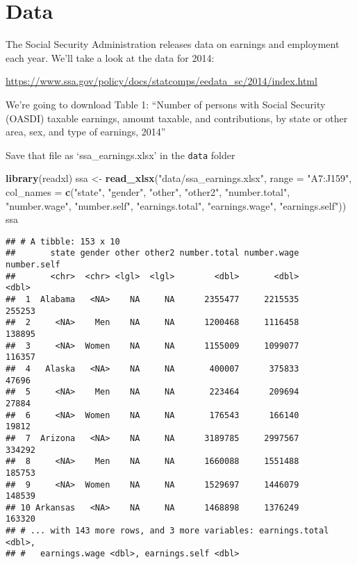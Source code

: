 \documentclass[]{book}
\newenvironment{Shaded}{\begin{snugshade}}{\end{snugshade}}
\newcommand{\KeywordTok}[1]{\textcolor[rgb]{0.13,0.29,0.53}{\textbf{{#1}}}}
\newcommand{\DataTypeTok}[1]{\textcolor[rgb]{0.13,0.29,0.53}{{#1}}}
\newcommand{\StringTok}[1]{\textcolor[rgb]{0.31,0.60,0.02}{{#1}}}
\newcommand{\NormalTok}[1]{{#1}}
\theoremstyle{definition}
\theoremstyle{definition}
\theoremstyle{remark}
\begin{document}
\section{Data}\label{data-3}

The Social Security Administration releases data on earnings and
employment each year. We'll take a look at the data for 2014:

\url{https://www.ssa.gov/policy/docs/statcomps/eedata_sc/2014/index.html}

We're going to download Table 1: ``Number of persons with Social
Security (OASDI) taxable earnings, amount taxable, and contributions, by
state or other area, sex, and type of earnings, 2014''

Save that file as `ssa\_earnings.xlsx' in the \texttt{data} folder

\begin{Shaded}
\begin{Highlighting}[]
\KeywordTok{library}\NormalTok{(readxl)}
\NormalTok{ssa <-}\StringTok{ }\KeywordTok{read_xlsx}\NormalTok{(}\StringTok{"data/ssa_earnings.xlsx"}\NormalTok{, }\DataTypeTok{range =} \StringTok{"A7:J159"}\NormalTok{, }
                 \DataTypeTok{col_names =} \KeywordTok{c}\NormalTok{(}\StringTok{"state"}\NormalTok{, }\StringTok{"gender"}\NormalTok{, }\StringTok{"other"}\NormalTok{, }\StringTok{"other2"}\NormalTok{, }\StringTok{"number.total"}\NormalTok{, }\StringTok{"number.wage"}\NormalTok{, }\StringTok{"number.self"}\NormalTok{, }
                               \StringTok{"earnings.total"}\NormalTok{, }\StringTok{"earnings.wage"}\NormalTok{, }\StringTok{"earnings.self"}\NormalTok{))}
\NormalTok{ssa}
\end{Highlighting}
\end{Shaded}

\begin{verbatim}
## # A tibble: 153 x 10
##       state gender other other2 number.total number.wage number.self
##       <chr>  <chr> <lgl>  <lgl>        <dbl>       <dbl>       <dbl>
##  1  Alabama   <NA>    NA     NA      2355477     2215535      255253
##  2     <NA>    Men    NA     NA      1200468     1116458      138895
##  3     <NA>  Women    NA     NA      1155009     1099077      116357
##  4   Alaska   <NA>    NA     NA       400007      375833       47696
##  5     <NA>    Men    NA     NA       223464      209694       27884
##  6     <NA>  Women    NA     NA       176543      166140       19812
##  7  Arizona   <NA>    NA     NA      3189785     2997567      334292
##  8     <NA>    Men    NA     NA      1660088     1551488      185753
##  9     <NA>  Women    NA     NA      1529697     1446079      148539
## 10 Arkansas   <NA>    NA     NA      1468898     1376249      163320
## # ... with 143 more rows, and 3 more variables: earnings.total <dbl>,
## #   earnings.wage <dbl>, earnings.self <dbl>
\end{verbatim}
\end{document}
